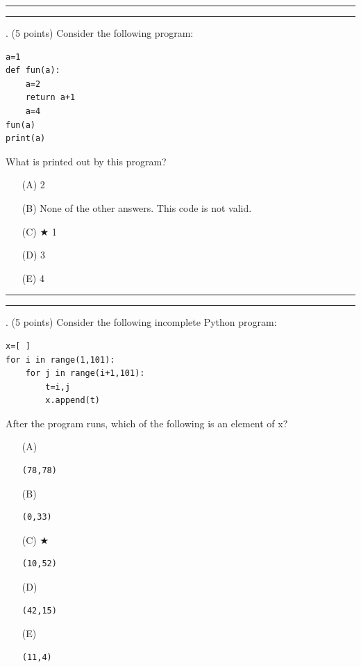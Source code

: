 \documentclass{article}
\begin{document}
\vspace*{2em}
\hrule
\vspace{2em}

\vspace{2em}
\hrule height 2pt


\newpage
{}. (5 points)
Consider the following program:
\begin{verbatim}
a=1
def fun(a):
    a=2
    return a+1
    a=4
fun(a)
print(a)
\end{verbatim}
What is printed out by this program?


\begin{enumerate}
\item[(A)]
2

\item[(B)]
None of the other answers. This code is not valid.

\item[(C)] $\bigstar$ 
1

\item[(D)]
3

\item[(E)]
4

\end{enumerate}

\vspace*{2em}
\hrule
\vspace{2em}

\vspace{2em}
\hrule height 2pt


\newpage
{}. (5 points)
Consider the following incomplete Python program:
\begin{verbatim}
x=[ ]
for i in range(1,101):
    for j in range(i+1,101):
        t=i,j
        x.append(t)
\end{verbatim}
After the program runs, which of the following is an element of x?


\begin{enumerate}
\item[(A)]
\begin{verbatim}(78,78)\end{verbatim}

\item[(B)]
\begin{verbatim}(0,33)\end{verbatim}

\item[(C)] $\bigstar$ 
\begin{verbatim}(10,52)\end{verbatim}

\item[(D)]
\begin{verbatim}(42,15)\end{verbatim}

\item[(E)]
\begin{verbatim}(11,4)\end{verbatim}

\end{enumerate}
\end{document}
